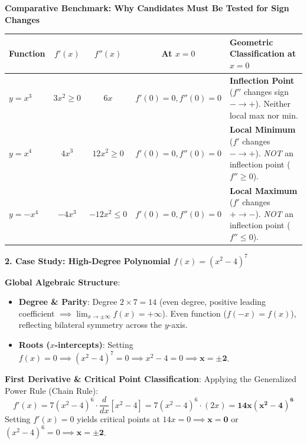 \documentclass[11pt]{article}
\begin{document}
\vspace{2pt}
\textbf{\small Comparative Benchmark: Why Candidates Must Be Tested for Sign Changes}
\vspace{1pt}

\begin{center}
\renewcommand{\arraystretch}{1.08}
\footnotesize
\begin{tabularx}{\textwidth}{@{} l c c c X @{}}
\toprule
\textbf{Function} & $f'(x)$ & $f''(x)$ & \textbf{At $x=0$} & \textbf{Geometric Classification at $x=0$} \\
\midrule
$y = x^3$  & $3x^2 \ge 0$ & $6x$       & $f'(0)=0, f''(0)=0$ & \textcolor{accentTeal}{\textbf{Inflection Point}} ($f''$ changes sign $-\to+$). Neither local max nor min. \\
$y = x^4$  & $4x^3$       & $12x^2 \ge 0$ & $f'(0)=0, f''(0)=0$ & \textcolor{dukeBlue}{\textbf{Local Minimum}} ($f'$ changes $-\to+$). \textit{NOT} an inflection point ($f'' \ge 0$). \\
$y = -x^4$ & $-4x^3$      & $-12x^2 \le 0$ & $f'(0)=0, f''(0)=0$ & \textcolor{accentRed}{\textbf{Local Maximum}} ($f'$ changes $+\to-$). \textit{NOT} an inflection point ($f'' \le 0$). \\
\bottomrule
\end{tabularx}
\end{center}

\vspace{2pt}
\textbf{\normalsize \textcolor{dukeNavy}{2. Case Study: High-Degree Polynomial $f(x) = (x^2 - 4)^7$}}
\vspace{1pt}

\textbf{Global Algebraic Structure}:
\begin{itemize}[leftmargin=1.2em, itemsep=1pt, topsep=1pt]
  \item \textbf{Degree \& Parity}: Degree $2 \times 7 = 14$ (even degree, positive leading coefficient $\implies \lim_{x \to \pm\infty} f(x) = +\infty$). Even function ($f(-x) = f(x)$), reflecting bilateral symmetry across the $y$-axis.
  \item \textbf{Roots ($x$-intercepts)}: Setting $f(x) = 0 \implies (x^2 - 4)^7 = 0 \implies x^2 - 4 = 0 \implies \mathbf{x = \pm 2}$.
\end{itemize}

\textbf{First Derivative \& Critical Point Classification}:
Applying the Generalized Power Rule (Chain Rule):
\[
f'(x) = 7(x^2 - 4)^6 \cdot \frac{d}{dx}[x^2 - 4] = 7(x^2 - 4)^6 \cdot (2x) = \mathbf{14x(x^2 - 4)^6}
\]
Setting $f'(x) = 0$ yields critical points at $14x = 0 \implies \mathbf{x = 0}$ or $(x^2 - 4)^6 = 0 \implies \mathbf{x = \pm 2}$.
\end{document}

